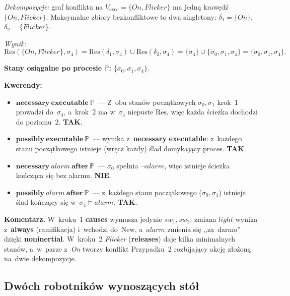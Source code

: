 \documentclass[11pt,a4paper]{article}
\newcommand{\causes}{\textbf{causes}}
\newcommand{\aft}{\textbf{after}}
\newcommand{\always}{\textbf{always}}
\newcommand{\releases}{\textbf{releases}}
\newcommand{\noninertial}{\textbf{noninertial}}
\newcommand{\necessary}{\textbf{necessary}}
\newcommand{\possibly}{\textbf{possibly}}
\newcommand{\executable}{\textbf{executable}}
\theoremstyle{definition}
\begin{document}
\smallskip\noindent
\emph{Dekompozycje:} graf konfliktu na $V_{\mathrm{exec}} = \{\mathit{On}, \mathit{Flicker}\}$
ma jedną krawędź $\{\mathit{On}, \mathit{Flicker}\}$. Maksymalne zbiory bezkonfliktowe to
dwa singletony: $\delta_1 = \{\mathit{On}\}$, $\delta_2 = \{\mathit{Flicker}\}$.

\smallskip\noindent
\emph{Wynik:}
\[
  \mathrm{Res}(\{\mathit{On}, \mathit{Flicker}\}, \sigma_4)
  = \mathrm{Res}(\delta_1, \sigma_4) \cup \mathrm{Res}(\delta_2, \sigma_4)
  = \{\sigma_4\} \cup \{\sigma_0, \sigma_1, \sigma_4\}
  = \{\sigma_0, \sigma_1, \sigma_4\}.
\]

\medskip
\noindent\textbf{Stany osiągalne po procesie $\mathbb{P}$:} $\{\sigma_0, \sigma_1, \sigma_4\}$.

\medskip
\noindent\textbf{Kwerendy:}
\begin{itemize}
  \item $\necessary\ \executable\ \mathbb{P}$~---
    Z~obu stanów początkowych $\sigma_0, \sigma_1$ krok~1 prowadzi do~$\sigma_4$,
    a~krok~2 ma w~$\sigma_4$ niepuste $\mathrm{Res}$,
    więc każda ścieżka dochodzi do poziomu~$2$. \textbf{TAK}.

  \item $\possibly\ \executable\ \mathbb{P}$~---
    wynika z~\necessary{} \executable{}: z~każdego stanu początkowego istnieje (wręcz każdy) ślad domykający proces. \textbf{TAK}.

  \item $\necessary\ \mathit{alarm}\ \aft\ \mathbb{P}$~---
    $\sigma_0$ spełnia $\neg\mathit{alarm}$, więc istnieje ścieżka kończąca się bez alarmu. \textbf{NIE}.

  \item $\possibly\ \mathit{alarm}\ \aft\ \mathbb{P}$~---
    z~każdego stanu początkowego ($\sigma_0, \sigma_1$) istnieje ślad kończący się w~$\sigma_4 \models \mathit{alarm}$. \textbf{TAK}.
\end{itemize}

\medskip
\noindent\textbf{Komentarz.}
W~kroku~1 \causes{} wymusza jedynie $\mathit{sw_1},\mathit{sw_2}$; zmiana $\mathit{light}$ wynika
z~\always{} (ramifikacja) i~wchodzi do~$\mathrm{New}$, a~$\mathit{alarm}$ zmienia się ,,za~darmo''
dzięki \noninertial{}. W~kroku~2 \textit{Flicker} (\releases{}) daje kilka minimalnych stanów,
a~w~parze z~\textit{On} tworzy konflikt Przypadku~2 rozbijający akcję złożoną na~dwie dekompozycje.

\subsection{Dwóch robotników wynoszących stół}
\label{sec:ex-table}
\end{document}
